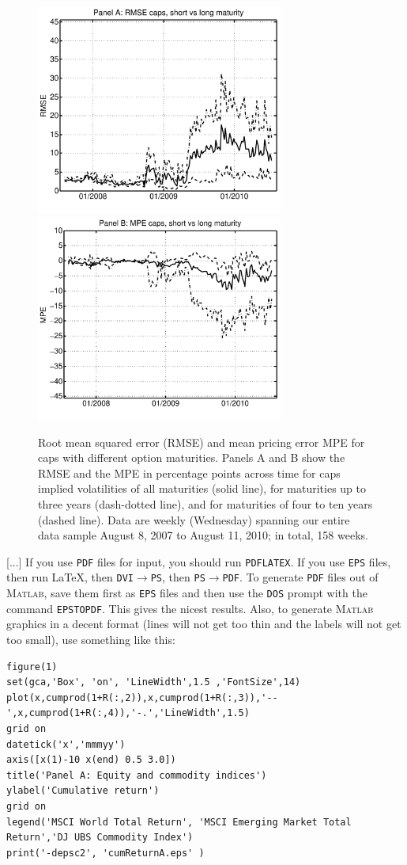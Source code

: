 \documentclass[11pt,a4paper,english,oneside]{book}
\numberwithin{equation}{chapter}
\begin{document}
\begin{figure}[t!]
\begin{center}
  \includegraphics[width=3.20in]{RMSE_ivcapsjoint.pdf}
  \includegraphics[width=3.20in]{MPE_ivcapsjoint.pdf}
\end{center}
  \caption[RMSE and  MPE for Caps with Different Maturities]{Root mean squared error (RMSE) and mean pricing error MPE for caps with different option maturities.
Panels A and B show the RMSE and the MPE in percentage points  across time for caps implied volatilities
of all maturities (solid line), for maturities up to three years (dash-dotted line), and for maturities of four to ten years (dashed line). Data are
weekly (Wednesday) spanning our entire data sample August 8, 2007 to
August 11, 2010; in total, 158 weeks.}
   \label{output2}
\end{figure}


[...] If you use \texttt{PDF} files for input, you should run \texttt{PDFLATEX}. If you use \texttt{EPS} files, then run \LaTeX, then \texttt{DVI}$\rightarrow$\texttt{PS}, then \texttt{PS}$\rightarrow$\texttt{PDF}. To generate \texttt{PDF} files out of \textsc{Matlab}, save them first as \texttt{EPS} files and then use the \texttt{DOS} prompt with the command \texttt{EPSTOPDF}. This gives the nicest results. Also, to generate \textsc{Matlab} graphics in a decent format (lines will not get too thin and the labels will not get too small), use something like this:
\begin{lstlisting}
figure(1)
set(gca,'Box', 'on', 'LineWidth',1.5 ,'FontSize',14)
plot(x,cumprod(1+R(:,2)),x,cumprod(1+R(:,3)),'--',x,cumprod(1+R(:,4)),'-.','LineWidth',1.5)
grid on
datetick('x','mmmyy')
axis([x(1)-10 x(end) 0.5 3.0])
title('Panel A: Equity and commodity indices')
ylabel('Cumulative return')
grid on
legend('MSCI World Total Return', 'MSCI Emerging Market Total Return','DJ UBS Commodity Index')
print('-depsc2', 'cumReturnA.eps' )
\end{lstlisting}
\end{document}
